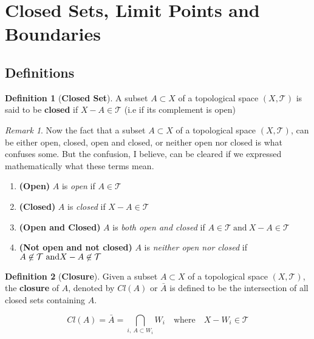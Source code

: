 \documentclass{article}
\theoremstyle{remark}
\newtheorem*{remark}{Remark}
\theoremstyle{definition}
\newtheorem{definition}{Definition}[section]
\begin{document}
\newpage



\section{Closed Sets, Limit Points and Boundaries}
\bigskip
\subsection{Definitions}

\bigskip

\begin{definition}[\textbf{Closed Set}]
A subset $A \subset X$ of a topological space $(X , \mathcal{T})$ is said to be \textbf{closed} if $X-A \in \mathcal{T}$ (i.e if its complement is open) 
\end{definition}

\begin{remark}
Now the fact that a subset $A \subset X$ of a topological space $(X, \mathcal{T})$, can be either open, closed, open and closed, or neither open nor closed is what confuses some. But the confusion, I believe, can be cleared if we expressed mathematically what these terms mean.

\begin{enumerate}
  \item \textbf{(Open)} $A$ is \textit{open} if $A \in \mathcal{T}$ 
  \item \textbf{(Closed)} $A$ is \textit{closed} if $X - A \in \mathcal{T}$
  \item \textbf{(Open and Closed)} $A$ is \textit{both open and closed} if $A \in \mathcal{T} \  \text{and} \ X - A \in \mathcal{T}$
  \item \textbf{(Not open and  not closed)} $A$ is \textit{neither open nor closed} if $A \not\in \mathcal{T} \  \text{and} \ \\X - A \not\in \mathcal{T}$ 
\end{enumerate}
\end{remark}

\medskip

\begin{definition}[\textbf{Closure}]
Given a subset $A \subset X$ of a topological space $(X , \mathcal{T})$, the \textbf{closure} of $A$, denoted by $Cl(A)$ or $\bar{A}$ is defined to be the intersection of all closed sets containing $A$.

$$Cl(A) = \bar{A} = \bigcap_{i , \  A \subset W_i} W_i \ \ \ \text{ where } \ \ \ X - W_i \in \mathcal{T}$$

\end{definition}
\end{document}
